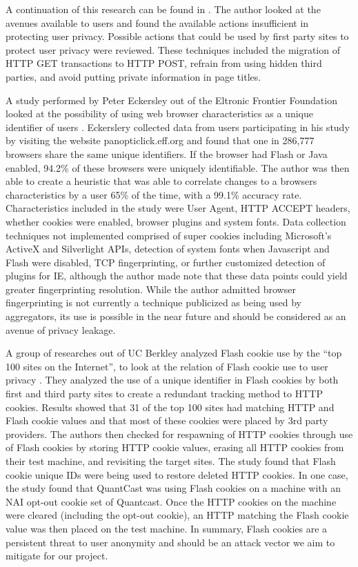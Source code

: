 \documentclass[11pt,twocolumn]{article}
\begin{document}
A continuation of this research can be found in \cite{Wills2011Identifying}. The author looked at the avenues available to users and found the available actions insufficient in protecting user privacy. Possible actions that could be used by first party sites to protect user privacy were reviewed. These techniques included the migration of HTTP GET transactions to HTTP POST, refrain from using hidden third parties, and avoid putting private information in page titles.

A study performed by Peter Eckersley out of the Eltronic Frontier Foundation looked at the possibility of using web browser characteristics as a unique identifier of users \cite{Eckersley:2010:UYW:1881151.1881152}. Eckerslery collected data from users participating in his study by visiting the website panopticlick.eff.org and found that one in 286,777 browsers share the same unique identifiers. If the browser had Flash or Java enabled, 94.2\% of these browsers were uniquely identifiable. The author was then able to create a heuristic that was able to correlate changes to a browsers characteristics by a user 65\% of the time, with a 99.1\% accuracy rate. Characteristics included in the study were User Agent, HTTP ACCEPT headers, whether cookies were enabled, browser plugins and system fonts. Data collection techniques not implemented comprised of super cookies including Microsoft's ActiveX and Silverlight APIs, detection of system fonts when Javascript and Flash were disabled, TCP fingerprinting, or further customized detection of plugins for IE, although the author made note that these data points could yield greater fingerprinting resolution. While the author admitted browser fingerprinting is not currently a technique publicized as being used by aggregators, its use is possible in the near future and should be considered as an avenue of privacy leakage.
	
A group of researches out of UC Berkley analyzed Flash cookie use by the ``top 100 sites on the Internet'', to look at the relation of Flash cookie use to user privacy \cite{Soltani2009Flash}. They analyzed the use of a unique identifier in Flash cookies by both first and third party sites to create a redundant tracking method to HTTP cookies. Results showed that 31 of the top 100 sites had matching HTTP and Flash cookie values and that most of these cookies were placed by 3rd party providers. The authors then checked for respawning of HTTP cookies through use of Flash cookies by storing HTTP cookie values, erasing all HTTP cookies from their test machine, and revisiting the target sites. The study found that Flash cookie unique IDs were being used to restore deleted HTTP cookies. In one case, the study found that QuantCast was using Flash cookies on a machine with an NAI opt-out cookie set of Quantcast. Once the HTTP cookies on the machine were cleared (including the opt-out cookie), an HTTP matching the Flash cookie value was then placed on the test machine. In summary, Flash cookies are a persistent threat to user anonymity and should be an attack vector we aim to mitigate for our project.
\end{document}
